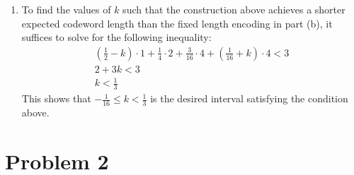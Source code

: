 \documentclass[12pt]{article}%
\begin{document}
\begin{enumerate}
\item 
To find the values of $k$ such that the construction above achieves a shorter expected codeword length than the fixed length encoding in part (b), it suffices to solve for the following inequality:
\begin{gather*}
  \left(\frac{1}{2} - k \right) \cdot 1 + \frac{1}{4} \cdot 2 + \frac{3}{16}\cdot 4  + \left(\frac{1}{16} + k \right) \cdot 4  < 3 \\
  2 + 3k  < 3 \\
  k < \frac{1}{3}
\end{gather*}
This shows that $-\frac{1}{16} \leq k < \frac{1}{3}$ is the desired interval satisfying the condition above.
\end{enumerate}

\section*{Problem 2}
\end{document}

